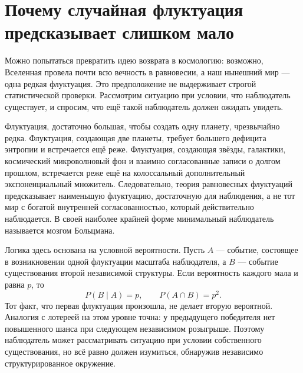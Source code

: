 \section{Почему случайная флуктуация предсказывает слишком мало}

Можно попытаться превратить идею возврата в космологию: возможно, Вселенная провела почти всю вечность в равновесии, а наш нынешний мир — одна редкая флуктуация. Это предположение не выдерживает строгой статистической проверки. Рассмотрим ситуацию при условии, что наблюдатель существует, и спросим, что ещё такой наблюдатель должен ожидать увидеть.

Флуктуация, достаточно большая, чтобы создать одну планету, чрезвычайно редка. Флуктуация, создающая две планеты, требует большего дефицита энтропии и встречается ещё реже. Флуктуация, создающая звёзды, галактики, космический микроволновый фон и взаимно согласованные записи о долгом прошлом, встречается реже ещё на колоссальный дополнительный экспоненциальный множитель. Следовательно, теория равновесных флуктуаций предсказывает наименьшую флуктуацию, достаточную для наблюдения, а не тот мир с богатой внутренней согласованностью, который действительно наблюдается. В своей наиболее крайней форме минимальный наблюдатель называется мозгом Больцмана.

Логика здесь основана на условной вероятности. Пусть \(A\) — событие, состоящее в возникновении одной флуктуации масштаба наблюдателя, а \(B\) — событие существования второй независимой структуры. Если вероятность каждого мала и равна \(p\), то
\begin{equation}
 P(B\mid A)=p,
 \qquad
 P(A\cap B)=p^2.
 \label{eq:sm8-conditional-fluctuations}
\end{equation}
Тот факт, что первая флуктуация произошла, не делает вторую вероятной. Аналогия с лотереей на этом уровне точна: у предыдущего победителя нет повышенного шанса при следующем независимом розыгрыше. Поэтому наблюдатель может рассматривать ситуацию при условии собственного существования, но всё равно должен изумиться, обнаружив независимо структурированное окружение.

\begin{classroomqa}
\end{classroomqa}

